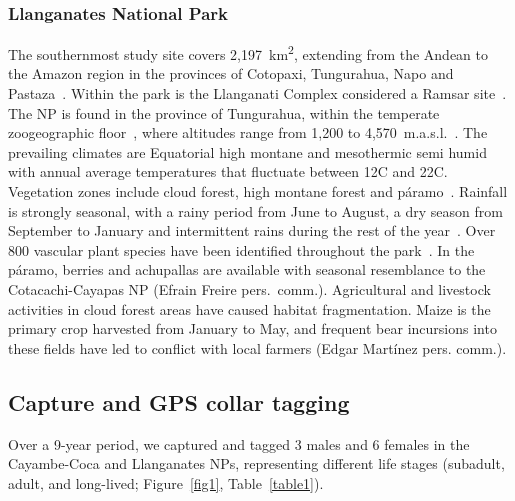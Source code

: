 \documentclass[lineno,referee,pdflatex,sn-vancouver-num]{sn-jnl}%
\theoremstyle{thmstyleone}%
\theoremstyle{thmstyletwo}%
\theoremstyle{thmstylethree}%
\begin{document}
\subsubsection{Llanganates National Park}

The southernmost study site covers 2,197~km\textsuperscript{2}, extending from the Andean to the Amazon region in the provinces of Cotopaxi, Tungurahua, Napo and Pastaza~\cite{ministeriodelambientePlanManejoParque2013}. Within the park is the Llanganati Complex considered a Ramsar site~\cite{ministeriodelambientePlanManejoParque2013}. The NP is found in the province of Tungurahua, within the temperate zoogeographic floor~\cite{albujaFaunaVertebradosEcuador2012}, where altitudes range from 1,200 to 4,570~m.a.s.l.~\cite{ministeriodelambientePlanManejoParque2013}. The prevailing climates are Equatorial high montane and mesothermic semi humid with annual average temperatures that fluctuate between 12{\textdegree}C and 22{\textdegree}C. Vegetation zones include cloud forest, high montane forest and páramo~\cite{sierraPropuestaPreliminarSistema1999}. Rainfall is strongly seasonal, with a rainy period from June to August, a dry season from September to January and intermittent rains during the rest of the year~\cite{institutonacionaldemeteorologiaehidrologiaAnuarioMeteorologico20132017}. Over 800 vascular plant species have been identified throughout the park~\cite{ministeriodelambientePlanManejoParque2013}. In the páramo, berries and achupallas are available with seasonal resemblance to the Cotacachi-Cayapas NP (Efrain Freire pers.\ comm.).
Agricultural and livestock activities in cloud forest areas have caused habitat fragmentation. Maize is the primary crop harvested from January to May, and frequent bear incursions into these fields have led to conflict with local farmers (Edgar Mart\'{i}nez pers. comm.).

\subsection{Capture and GPS collar tagging}

Over a 9-year period, we captured and tagged 3 males and 6 females in the Cayambe-Coca and Llanganates NPs, representing different life stages (subadult, adult, and long-lived; Figure~\ref{fig1}, Table~\ref{table1}).
\end{document}
